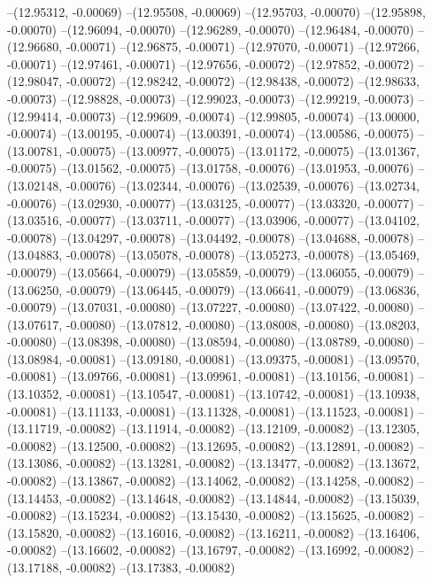 --(12.95312, -0.00069)
--(12.95508, -0.00069)
--(12.95703, -0.00070)
--(12.95898, -0.00070)
--(12.96094, -0.00070)
--(12.96289, -0.00070)
--(12.96484, -0.00070)
--(12.96680, -0.00071)
--(12.96875, -0.00071)
--(12.97070, -0.00071)
--(12.97266, -0.00071)
--(12.97461, -0.00071)
--(12.97656, -0.00072)
--(12.97852, -0.00072)
--(12.98047, -0.00072)
--(12.98242, -0.00072)
--(12.98438, -0.00072)
--(12.98633, -0.00073)
--(12.98828, -0.00073)
--(12.99023, -0.00073)
--(12.99219, -0.00073)
--(12.99414, -0.00073)
--(12.99609, -0.00074)
--(12.99805, -0.00074)
--(13.00000, -0.00074)
--(13.00195, -0.00074)
--(13.00391, -0.00074)
--(13.00586, -0.00075)
--(13.00781, -0.00075)
--(13.00977, -0.00075)
--(13.01172, -0.00075)
--(13.01367, -0.00075)
--(13.01562, -0.00075)
--(13.01758, -0.00076)
--(13.01953, -0.00076)
--(13.02148, -0.00076)
--(13.02344, -0.00076)
--(13.02539, -0.00076)
--(13.02734, -0.00076)
--(13.02930, -0.00077)
--(13.03125, -0.00077)
--(13.03320, -0.00077)
--(13.03516, -0.00077)
--(13.03711, -0.00077)
--(13.03906, -0.00077)
--(13.04102, -0.00078)
--(13.04297, -0.00078)
--(13.04492, -0.00078)
--(13.04688, -0.00078)
--(13.04883, -0.00078)
--(13.05078, -0.00078)
--(13.05273, -0.00078)
--(13.05469, -0.00079)
--(13.05664, -0.00079)
--(13.05859, -0.00079)
--(13.06055, -0.00079)
--(13.06250, -0.00079)
--(13.06445, -0.00079)
--(13.06641, -0.00079)
--(13.06836, -0.00079)
--(13.07031, -0.00080)
--(13.07227, -0.00080)
--(13.07422, -0.00080)
--(13.07617, -0.00080)
--(13.07812, -0.00080)
--(13.08008, -0.00080)
--(13.08203, -0.00080)
--(13.08398, -0.00080)
--(13.08594, -0.00080)
--(13.08789, -0.00080)
--(13.08984, -0.00081)
--(13.09180, -0.00081)
--(13.09375, -0.00081)
--(13.09570, -0.00081)
--(13.09766, -0.00081)
--(13.09961, -0.00081)
--(13.10156, -0.00081)
--(13.10352, -0.00081)
--(13.10547, -0.00081)
--(13.10742, -0.00081)
--(13.10938, -0.00081)
--(13.11133, -0.00081)
--(13.11328, -0.00081)
--(13.11523, -0.00081)
--(13.11719, -0.00082)
--(13.11914, -0.00082)
--(13.12109, -0.00082)
--(13.12305, -0.00082)
--(13.12500, -0.00082)
--(13.12695, -0.00082)
--(13.12891, -0.00082)
--(13.13086, -0.00082)
--(13.13281, -0.00082)
--(13.13477, -0.00082)
--(13.13672, -0.00082)
--(13.13867, -0.00082)
--(13.14062, -0.00082)
--(13.14258, -0.00082)
--(13.14453, -0.00082)
--(13.14648, -0.00082)
--(13.14844, -0.00082)
--(13.15039, -0.00082)
--(13.15234, -0.00082)
--(13.15430, -0.00082)
--(13.15625, -0.00082)
--(13.15820, -0.00082)
--(13.16016, -0.00082)
--(13.16211, -0.00082)
--(13.16406, -0.00082)
--(13.16602, -0.00082)
--(13.16797, -0.00082)
--(13.16992, -0.00082)
--(13.17188, -0.00082)
--(13.17383, -0.00082)
